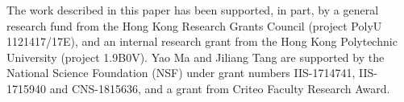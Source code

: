 \documentclass[sigconf]{acmart} \copyrightyear{2019}
\begin{document}
\begin{acks}

The work described in this paper has been supported, in part, by a general research fund from the Hong Kong Research Grants Council (project PolyU 1121417/17E), and an internal research grant from the Hong Kong Polytechnic University (project 1.9B0V). Yao Ma and Jiliang Tang are supported by the National Science Foundation (NSF) under grant numbers IIS-1714741, IIS-1715940 and CNS-1815636, and a grant from Criteo Faculty Research Award.

\end{acks}




\balance

\end{document}
